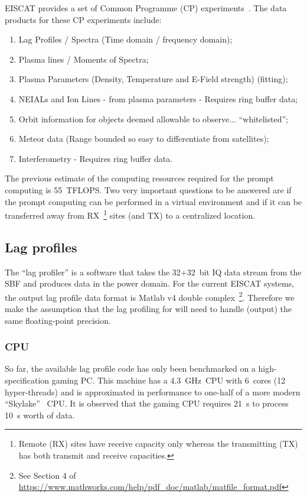 \documentclass[12pt,a4paper]{article}
\begin{document}
EISCAT provides a set of Common Programme (CP) experiments~\cite{eiscat-cp1}.
The data products for these CP experiments include:
\begin{enumerate}
    \item Lag Profiles / Spectra (Time domain / frequency domain);
    \item Plasma lines / Moments of Spectra;
    \item Plasma Parameters (Density, Temperature and E-Field strength) (fitting);
    \item NEIALs and Ion Lines - from plasma parameters - Requires ring buffer data;
    \item Orbit information for objects deemed allowable to observe... ``whitelisted'';
    \item Meteor data (Range bounded so easy to differentiate from satellites);
    \item Interferometry - Requires ring buffer data.
\end{enumerate}

The previous estimate of the computing resources required for the prompt computing is 55~TFLOPS.
Two very important questions to be answered are 
if the prompt computing can be
performed in a virtual environment and if it can be transferred away from RX~\footnote{Remote (RX) sites have receive capacity only whereas the transmitting (TX) has both transmit and receive capacities.} sites (and TX) to a centralized location.

\subsection{Lag profiles}

The ``lag profiler'' is a software that takes the 32+32~bit IQ data stream from the SBF and produces data in the power domain.
For the current EISCAT systems, the output lag profile data format is Matlab v4 double complex~\footnote{See Section 4 of \url{https://www.mathworks.com/help/pdf_doc/matlab/matfile_format.pdf}}.
Therefore we make the assumption that the lag profiling for \ED will need to handle (output) the same floating-point precision.

\subsubsection{CPU}

So far, the available lag profile code has only been benchmarked on a high-specification gaming PC.
This machine has a 4.3~GHz~CPU with 6~cores (12 hyper-threads) and is approximated in performance to one-half of a more modern ``Skylake''~\cite{skylake} CPU.
It is observed that the gaming CPU requires 21~s to process 10~s worth of data.
\end{document}
